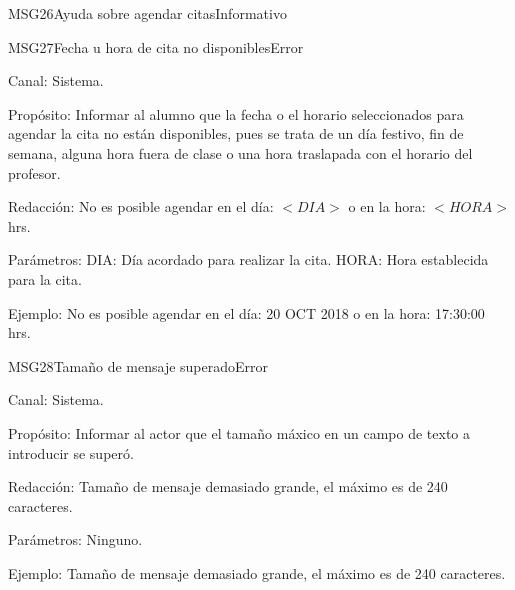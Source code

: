 \begin{mensaje}{MSG26}{Ayuda sobre agendar citas}{Informativo}
\end{mensaje}

\begin{mensaje}{MSG27}{Fecha u hora de cita no disponibles}{Error}
	\item[Canal:] Sistema.
    \item[Propósito:] Informar al alumno que la fecha o el horario seleccionados para agendar la cita no están disponibles, pues se trata de un día festivo, fin de semana, alguna hora fuera de clase o una hora traslapada con el horario del profesor.
    \item[Redacción:] No es posible agendar en el día: $<DIA>$ o en la hora: $<HORA>$hrs. 
    \item[Parámetros:] DIA: Día acordado para realizar la cita. HORA: Hora establecida para la cita.
    \item[Ejemplo:] No es posible agendar en el día: 20 OCT 2018 o en la hora: 17:30:00 hrs.
\end{mensaje}

\begin{mensaje}{MSG28}{Tamaño de mensaje superado}{Error}
	\item[Canal:] Sistema.
    \item[Propósito:] Informar al actor que el tamaño máxico en un campo de texto a introducir se superó. 
    \item[Redacción:] Tamaño de mensaje demasiado grande, el máximo es de 240 caracteres.
    \item[Parámetros:] Ninguno.
    \item[Ejemplo:] Tamaño de mensaje demasiado grande, el máximo es de 240 caracteres.
\end{mensaje}